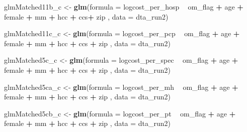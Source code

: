 \documentclass[]{article}
\newenvironment{Shaded}{\begin{snugshade}}{\end{snugshade}}
\newcommand{\KeywordTok}[1]{\textcolor[rgb]{0.13,0.29,0.53}{\textbf{#1}}}
\newcommand{\DataTypeTok}[1]{\textcolor[rgb]{0.13,0.29,0.53}{#1}}
\newcommand{\StringTok}[1]{\textcolor[rgb]{0.31,0.60,0.02}{#1}}
\newcommand{\OperatorTok}[1]{\textcolor[rgb]{0.81,0.36,0.00}{\textbf{#1}}}
\newcommand{\NormalTok}[1]{#1}
\begin{document}
\begin{Shaded}
\begin{Highlighting}[]
\NormalTok{glmMatched11b_c <-}\StringTok{ }\KeywordTok{glm}\NormalTok{(}\DataTypeTok{formula =}\NormalTok{ logcost_per_hosp }\OperatorTok{~}\StringTok{ }\NormalTok{om_flag }\OperatorTok{+}\StringTok{ }\NormalTok{age }\OperatorTok{+}\StringTok{ }\NormalTok{female }\OperatorTok{+}\StringTok{ }\NormalTok{mm }\OperatorTok{+}\StringTok{ }\NormalTok{hcc }\OperatorTok{+}\StringTok{ }\NormalTok{ccs}\OperatorTok{+}\StringTok{ }\NormalTok{zip  ,}
                     \DataTypeTok{data    =}\NormalTok{ dta_run2)}

\NormalTok{glmMatched11c_c <-}\StringTok{ }\KeywordTok{glm}\NormalTok{(}\DataTypeTok{formula =}\NormalTok{ logcost_per_pcp }\OperatorTok{~}\StringTok{ }\NormalTok{om_flag }\OperatorTok{+}\StringTok{ }\NormalTok{age }\OperatorTok{+}\StringTok{ }\NormalTok{female }\OperatorTok{+}\StringTok{ }\NormalTok{mm }\OperatorTok{+}\StringTok{ }\NormalTok{hcc }\OperatorTok{+}\StringTok{ }\NormalTok{ccs }\OperatorTok{+}\StringTok{ }\NormalTok{zip ,}
                     \DataTypeTok{data    =}\NormalTok{ dta_run2)}


\NormalTok{glmMatched5c_c <-}\StringTok{ }\KeywordTok{glm}\NormalTok{(}\DataTypeTok{formula =}\NormalTok{ logcost_per_spec }\OperatorTok{~}\StringTok{ }\NormalTok{om_flag }\OperatorTok{+}\StringTok{ }\NormalTok{age }\OperatorTok{+}\StringTok{ }\NormalTok{female }\OperatorTok{+}\StringTok{ }\NormalTok{mm }\OperatorTok{+}\StringTok{ }\NormalTok{hcc }\OperatorTok{+}\StringTok{ }\NormalTok{ccs }\OperatorTok{+}\StringTok{ }\NormalTok{zip ,}
                    \DataTypeTok{data    =}\NormalTok{ dta_run2)}


\NormalTok{glmMatched5ca_c <-}\StringTok{ }\KeywordTok{glm}\NormalTok{(}\DataTypeTok{formula =}\NormalTok{ logcost_per_mh }\OperatorTok{~}\StringTok{ }\NormalTok{om_flag }\OperatorTok{+}\StringTok{ }\NormalTok{age }\OperatorTok{+}\StringTok{ }\NormalTok{female }\OperatorTok{+}\StringTok{ }\NormalTok{mm }\OperatorTok{+}\StringTok{ }\NormalTok{hcc }\OperatorTok{+}\StringTok{ }\NormalTok{ccs }\OperatorTok{+}\StringTok{ }\NormalTok{zip ,}
                     \DataTypeTok{data    =}\NormalTok{ dta_run2)}


\NormalTok{glmMatched5cb_c <-}\StringTok{ }\KeywordTok{glm}\NormalTok{(}\DataTypeTok{formula =}\NormalTok{ logcost_per_pt }\OperatorTok{~}\StringTok{ }\NormalTok{om_flag }\OperatorTok{+}\StringTok{ }\NormalTok{age }\OperatorTok{+}\StringTok{ }\NormalTok{female }\OperatorTok{+}\StringTok{ }\NormalTok{mm }\OperatorTok{+}\StringTok{ }\NormalTok{hcc }\OperatorTok{+}\StringTok{ }\NormalTok{ccs }\OperatorTok{+}\StringTok{ }\NormalTok{zip ,}
                     \DataTypeTok{data    =}\NormalTok{ dta_run2)}




\end{Highlighting}
\end{Shaded}
\end{document}
